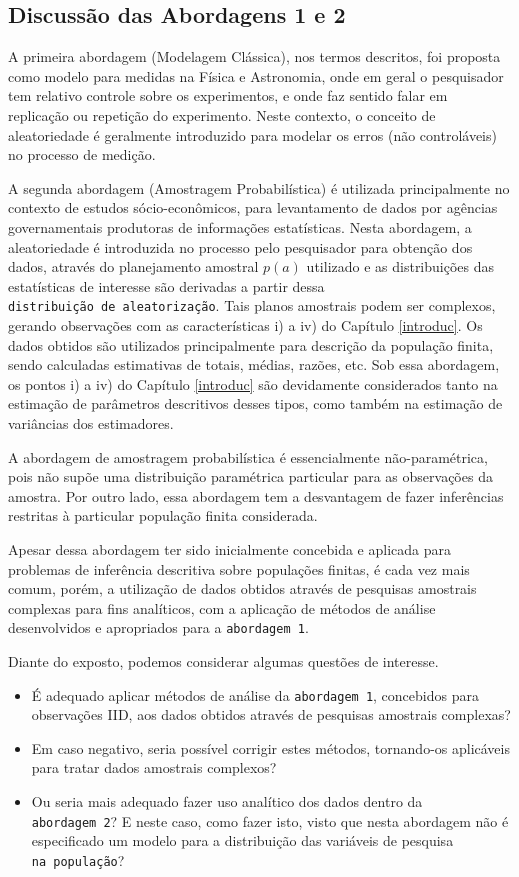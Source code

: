\documentclass[]{book}
\theoremstyle{definition}
\theoremstyle{definition}
\theoremstyle{definition}
\theoremstyle{remark}
\begin{document}
\subsection{Discussão das Abordagens 1 e
2}\label{discussao-das-abordagens-1-e-2}

A primeira abordagem (Modelagem Clássica), nos termos descritos, foi
proposta como modelo para medidas na Física e Astronomia, onde em geral
o pesquisador tem relativo controle sobre os experimentos, e onde faz
sentido falar em replicação ou repetição do experimento. Neste contexto,
o conceito de aleatoriedade é geralmente introduzido para modelar os
erros (não controláveis) no processo de medição.

A segunda abordagem (Amostragem Probabilística) é utilizada
principalmente no contexto de estudos sócio-econômicos, para
levantamento de dados por agências governamentais produtoras de
informações estatísticas. Nesta abordagem, a aleatoriedade é introduzida
no processo pelo pesquisador para obtenção dos dados, através do
planejamento amostral \(p(a)\) utilizado \citep{Neyman} e as
distribuições das estatísticas de interesse são derivadas a partir dessa
\texttt{distribuição\ de\ aleatorização}. Tais planos amostrais podem
ser complexos, gerando observações com as características i) a iv) do
Capítulo \ref{introduc}. Os dados obtidos são utilizados principalmente
para descrição da população finita, sendo calculadas estimativas de
totais, médias, razões, etc. Sob essa abordagem, os pontos i) a iv) do
Capítulo \ref{introduc} são devidamente considerados tanto na estimação
de parâmetros descritivos desses tipos, como também na estimação de
variâncias dos estimadores.

A abordagem de amostragem probabilística é essencialmente
não-paramétrica, pois não supõe uma distribuição paramétrica particular
para as observações da amostra. Por outro lado, essa abordagem tem a
desvantagem de fazer inferências restritas à particular população finita
considerada.

Apesar dessa abordagem ter sido inicialmente concebida e aplicada para
problemas de inferência descritiva sobre populações finitas, é cada vez
mais comum, porém, a utilização de dados obtidos através de pesquisas
amostrais complexas para fins analíticos, com a aplicação de métodos de
análise desenvolvidos e apropriados para a \texttt{abordagem\ 1}.

Diante do exposto, podemos considerar algumas questões de interesse.

\begin{itemize}
\item
  É adequado aplicar métodos de análise da \texttt{abordagem\ 1},
  concebidos para observações IID, aos dados obtidos através de
  pesquisas amostrais complexas?
\item
  Em caso negativo, seria possível corrigir estes métodos, tornando-os
  aplicáveis para tratar dados amostrais complexos?
\item
  Ou seria mais adequado fazer uso analítico dos dados dentro da
  \texttt{abordagem\ 2}? E neste caso, como fazer isto, visto que nesta
  abordagem não é especificado um modelo para a distribuição das
  variáveis de pesquisa \texttt{na\ população}?
\end{itemize}
\end{document}
